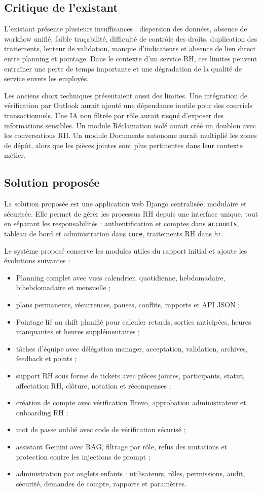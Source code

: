 \documentclass[12pt,a4paper]{report}
\begin{document}
\subsection{Critique de l'existant}
L'existant présente plusieurs insuffisances : dispersion des données, absence de workflow unifié, faible traçabilité, difficulté de contrôle des droits, duplication des traitements, lenteur de validation, manque d'indicateurs et absence de lien direct entre planning et pointage. Dans le contexte d'un service RH, ces limites peuvent entraîner une perte de temps importante et une dégradation de la qualité de service envers les employés.

Les anciens choix techniques présentaient aussi des limites. Une intégration de vérification par Outlook aurait ajouté une dépendance inutile pour des courriels transactionnels. Une IA non filtrée par rôle aurait risqué d'exposer des informations sensibles. Un module Réclamation isolé aurait créé un doublon avec les conversations RH. Un module Documents autonome aurait multiplié les zones de dépôt, alors que les pièces jointes sont plus pertinentes dans leur contexte métier.

\subsection{Solution proposée}
La solution proposée est une application web Django centralisée, modulaire et sécurisée. Elle permet de gérer les processus RH depuis une interface unique, tout en séparant les responsabilités : authentification et comptes dans \texttt{accounts}, tableau de bord et administration dans \texttt{core}, traitements RH dans \texttt{hr}.

Le système proposé conserve les modules utiles du rapport initial et ajoute les évolutions suivantes :
\begin{itemize}
\item Planning complet avec vues calendrier, quotidienne, hebdomadaire, bihebdomadaire et mensuelle ;
\item plans permanents, récurrences, pauses, conflits, rapports et API JSON ;
\item Pointage lié au shift planifié pour calculer retards, sorties anticipées, heures manquantes et heures supplémentaires ;
\item tâches d'équipe avec délégation manager, acceptation, validation, archives, feedback et points ;
\item support RH sous forme de tickets avec pièces jointes, participants, statut, affectation RH, clôture, notation et récompenses ;
\item création de compte avec vérification Brevo, approbation administrateur et onboarding RH ;
\item mot de passe oublié avec code de vérification sécurisé ;
\item assistant Gemini avec RAG, filtrage par rôle, refus des mutations et protection contre les injections de prompt ;
\item administration par onglets enfants : utilisateurs, rôles, permissions, audit, sécurité, demandes de compte, rapports et paramètres.
\end{itemize}
\end{document}
